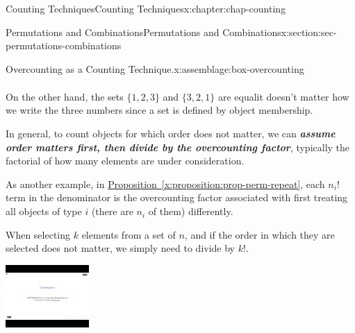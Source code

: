\documentclass[oneside,10pt,]{book}
\newcommand{\xreffont}{\relax}
\newcommand{\alert}[1]{\textbf{\textit{#1}}}
\numberwithin{equation}{section}
\newlength{\qrsize}
\newlength{\previewwidth}
\begin{document}
\begin{chapterptx}{Counting Techniques}{}{Counting Techniques}{}{}{x:chapter:chap-counting}
\begin{sectionptx}{Permutations and Combinations}{}{Permutations and Combinations}{}{}{x:section:sec-permutations-combinations}
\begin{assemblage}{Overcounting as a Counting Technique.}{x:assemblage:box-overcounting}
\begin{align*}
\end{align*}
%
\par
On the other hand, the sets \(\{1,2,3\}\) and \(\{3,2,1\}\) are equal\textemdash{}it doesn't matter how we write the three numbers since a set is defined by object membership.%
\par
In general, to count objects for which order does not matter, we can \alert{assume order matters first, then divide by the overcounting factor}, typically the factorial of how many elements are under consideration.%
\par
As another example, in \hyperref[x:proposition:prop-perm-repeat]{Proposition~{\xreffont\ref{x:proposition:prop-perm-repeat}}}, each \(n_i!\) term in the denominator is the overcounting factor associated with first treating all objects of type \(i\) (there are \(n_i\) of them) differently.%
\end{assemblage}
When selecting \(k\) elements from a set of \(n\), and if the order in which they are selected does not matter, we simply need to divide by \(k!\).%
\begin{sidebyside}{1}{0}{0}{0}%
\begin{sbspanel}{1}%
\setlength{\qrsize}{9em}
\setlength{\previewwidth}{\linewidth}
\addtolength{\previewwidth}{-\qrsize}
\begin{tcbraster}[raster columns=2, raster column skip=1pt, raster halign=center, raster force size=false, raster left skip=0pt, raster right skip=0pt]%
\begin{tcolorbox}[previewstyle, width=\previewwidth]%
\includegraphics[width=0.80\linewidth,height=\qrsize,keepaspectratio]{images/video-combination.jpg}%
\end{tcolorbox}%
\begin{tcolorbox}[qrstyle]%
{\hypersetup{urlcolor=black}}%

\end{tcolorbox}
\end{tcbraster}
\end{sbspanel}
\end{sidebyside}
\end{sectionptx}
\end{chapterptx}
\end{document}
